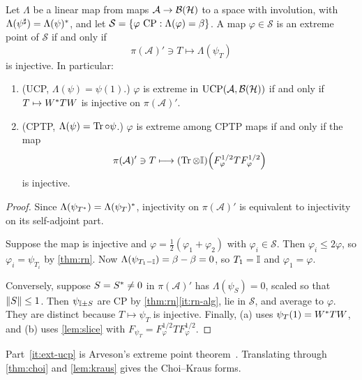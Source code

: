 \documentclass[12pt]{article}
\newcommand{\alg}{\mathcal{A}}             %
\newcommand{\hilb}{\mathcal{H}}            %
\newcommand{\bdd}[1]{\mathcal{B}\br{#1}}   %
\newcommand{\Fphi}{F_{\varphi}}
\begin{document}
\begin{theorem}
\label{thm:extreme}
Let \(\Lambda\) be a linear map from maps \(\alg \to \bdd\hilb\) to a space with
involution, with \(\Lambda(\psi^\sharp) = \Lambda(\psi)^*\), and let
\(\mathcal{S} = \left\{ \varphi \text{ CP} : \Lambda(\varphi) = \beta \right\}\). A map
\(\varphi \in \mathcal{S}\) is an extreme point of \(\mathcal{S}\) if and only if
\[
  \pi(\alg)' \ni T \longmapsto \Lambda(\psi_T)
\]
is injective. In particular:
\begin{enumerate}[label=(\alph*)]
  \item \label{it:ext-ucp}
    (UCP, \(\Lambda(\psi) = \psi(1)\).) \(\varphi\) is extreme in
    \(\mathrm{UCP}(\alg, \bdd\hilb)\) if and only if \(T \mapsto W^* TW\) is
    injective on \(\pi(\alg)'\).
  \item \label{it:ext-tp}
    (CPTP, \(\Lambda(\psi) = \operatorname{Tr}\circ\psi\).) \(\varphi\) is extreme among
    CPTP maps if and only if the map
    \[
      \pi(\alg)' \ni T \longmapsto (\trace \tensor \id)\br{\Fphi^{1/2}T\Fphi^{1/2}}
    \]
    is injective.
\end{enumerate}
\end{theorem}
\begin{proof}
Since \(\Lambda(\psi_{T^*}) = \Lambda(\psi_T)^*\), injectivity on
\(\pi(\alg)'\) is equivalent to injectivity on its self-adjoint part.

Suppose the map is injective and \(\varphi = \frac12(\varphi_1 + \varphi_2)\) with
\(\varphi_i \in \mathcal{S}\). Then \(\varphi_i \le 2\varphi\), so
\(\varphi_i = \psi_{T_i}\) by \cref{thm:rn}. Now
\(\Lambda(\psi_{T_1 - {\mathbb I}}) = \beta - \beta = 0\), so \(T_1 = {\mathbb I}\) and
\(\varphi_1 = \varphi\).

Conversely, suppose \(S = S^* \ne 0\) in \(\pi(\alg)'\) has
\(\Lambda(\psi_S) = 0\), scaled so that \(\left\| S \right\| \le 1\). Then
\(\psi_{{\mathbb I} \pm S}\) are CP by \cref{thm:rn}\ref{it:rn-alg}, lie in \(\mathcal{S}\),
and average to \(\varphi\). They are distinct because \(T \mapsto \psi_T\) is
injective. Finally, (a) uses \(\psi_T(1) = W^* TW\), and (b) uses
\cref{lem:slice} with \(F_{\psi_T} = \Fphi^{1/2}T\Fphi^{1/2}\).
\end{proof}

Part~\ref{it:ext-ucp} is Arveson's extreme point
theorem~\cite[Section~1.4]{Arveson1969}. Translating through \cref{thm:choi} and
\cref{lem:kraus} gives the Choi--Kraus forms.
\end{document}
